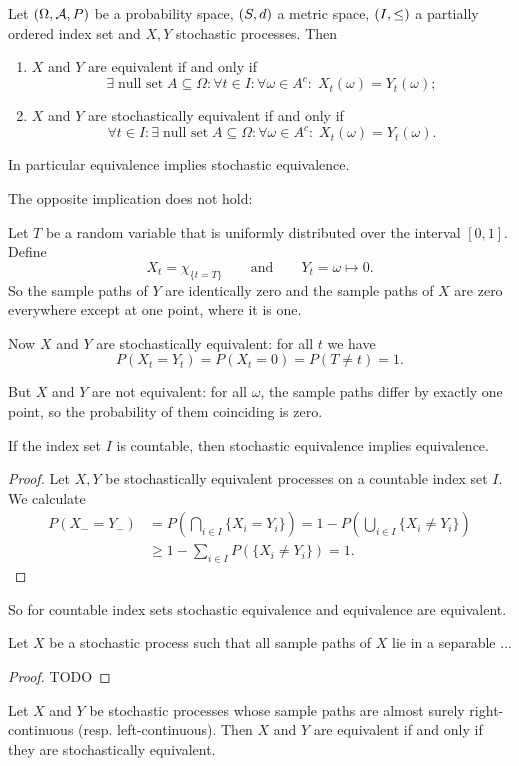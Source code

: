 \begin{lemma}
Let $\sSet{\Omega, \mathcal{A}, P}$ be a probability space, $\sSet{S,d}$ a metric space, $\sSet{I,\leq}$ a partially ordered index set and $X,Y$ stochastic processes. Then
\begin{enumerate}
\item $X$ and $Y$ are equivalent if and only if
\[ \exists \;\text{null set}\; A\subseteq \Omega: \forall t\in I: \forall \omega\in A^c: \; X_t(\omega) = Y_t(\omega); \]
\item $X$ and $Y$ are stochastically equivalent if and only if
\[ \forall t\in I: \exists \;\text{null set}\; A\subseteq \Omega: \forall \omega\in A^c: \; X_t(\omega) = Y_t(\omega).  \]
\end{enumerate}
In particular equivalence implies stochastic equivalence.
\end{lemma}
The opposite implication does not hold:
\begin{example}
Let $T$ be a random variable that is uniformly distributed over the interval $[0,1]$. Define
\[ X_t = \chi_{\{t=T\}} \qquad\text{and}\qquad Y_t = \omega\mapsto 0. \]
So the sample paths of $Y$ are identically zero and the sample paths of $X$ are zero everywhere except at one point, where it is one.

Now $X$ and $Y$ are stochastically equivalent: for all $t$ we have
\[  P(X_t = Y_t) = P(X_t = 0) = P(T \neq t) = 1. \]

But $X$ and $Y$ are not equivalent: for all $\omega$, the sample paths differ by exactly one point, so the probability of them coinciding is zero.
\end{example}

\begin{proposition}
If the index set $I$ is countable, then stochastic equivalence implies equivalence.
\end{proposition}
\begin{proof}
Let $X,Y$ be stochastically equivalent processes on a countable index set $I$. We calculate
\begin{align*}
P(X_- = Y_-) &= P\left(\bigcap_{i\in I}\{X_i = Y_i\}\right) = 1-P\left(\bigcup_{i\in I}\{X_i \neq Y_i\}\right) \\
&\geq 1 - \sum_{i\in I}P(\{X_i \neq Y_i\}) = 1.
\end{align*}
\end{proof}
So for countable index sets stochastic equivalence and equivalence are equivalent.

\begin{proposition}
Let $X$ be a stochastic process such that all sample paths of $X$ lie in a separable ...
\end{proposition}
\begin{proof}
TODO
\end{proof}
\begin{corollary}
Let $X$ and $Y$ be stochastic processes whose sample paths are almost surely right-continuous (resp. left-continuous). Then $X$ and $Y$ are equivalent \textup{if and only if} they are stochastically equivalent.
\end{corollary}

